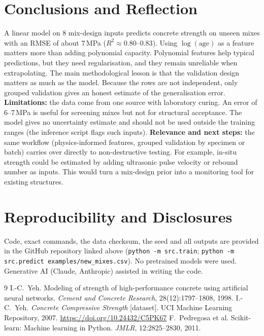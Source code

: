 \documentclass[10pt,a4paper]{article}
\begin{document}
\section{Conclusions and Reflection}
A linear model on 8 mix-design inputs predicts concrete strength on unseen mixes with an RMSE of about
7\,MPa ($R^2\approx0.80$--$0.83$). Using $\log(\text{age})$ as a feature matters more than adding
polynomial capacity. Polynomial features help typical predictions, but they need regularisation, and they
remain unreliable when extrapolating. The main methodological lesson is that the validation design matters
as much as the model. Because the rows are not independent, only grouped validation gives an honest estimate of the
generalisation error.
\textbf{Limitations:} the data come from one source with laboratory curing. An error of 6--7\,MPa is useful
for screening mixes but not for structural acceptance. The model gives no uncertainty estimate and should not be
used outside the training ranges (the inference script flags such inputs).
\textbf{Relevance and next steps:} the same workflow (physics-informed features, grouped validation by
specimen or batch) carries over directly to non-destructive testing. For example, in-situ strength could be
estimated by adding ultrasonic pulse velocity or rebound number as inputs. This would turn a mix-design
prior into a monitoring tool for existing structures.

\section*{Reproducibility and Disclosures}
Code, exact commands, the data checksum, the seed and all outputs are provided in the GitHub repository
linked above (\texttt{python -m src.train}; \texttt{python -m src.predict examples/new\_mixes.csv}).
No pretrained models were used. Generative AI (Claude, Anthropic) assisted in writing the code.

\begin{thebibliography}{9}\setlength{\itemsep}{0pt}\small
{} I.-C.\ Yeh. Modeling of strength of high-performance concrete using artificial neural networks. \emph{Cement and Concrete Research}, 28(12):1797--1808, 1998.
 I.-C.\ Yeh. \emph{Concrete Compressive Strength} [dataset]. UCI Machine Learning Repository, 2007. \url{https://doi.org/10.24432/C5PK67}
 F.\ Pedregosa et al. Scikit-learn: Machine learning in Python. \emph{JMLR}, 12:2825--2830, 2011.
\end{thebibliography}
\end{document}
